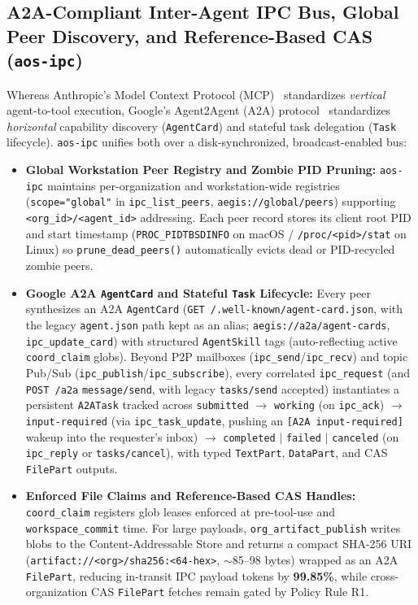 \documentclass[10pt,twocolumn]{article}
\begin{document}
\subsection{A2A-Compliant Inter-Agent IPC Bus, Global Peer Discovery, and Reference-Based CAS (\texttt{aos-ipc})}
\label{sec:ipc}

Whereas Anthropic's Model Context Protocol (MCP)~\cite{anthropic2024mcp} standardizes \emph{vertical} agent-to-tool execution, Google's Agent2Agent (A2A) protocol~\cite{google2025a2a} standardizes \emph{horizontal} capability discovery (\texttt{AgentCard}) and stateful task delegation (\texttt{Task} lifecycle). \texttt{aos-ipc} unifies both over a disk-synchronized, broadcast-enabled bus:
\begin{itemize}
    \item \textbf{Global Workstation Peer Registry and Zombie PID Pruning:} \texttt{aos-ipc} maintains per-organization and workstation-wide registries (\texttt{scope="global"} in \texttt{ipc\_list\_peers}, \texttt{aegis://global/peers}) supporting \texttt{<org\_id>/<agent\_id>} addressing. Each peer record stores its client root PID and start timestamp (\texttt{PROC\_PIDTBSDINFO} on macOS / \texttt{/proc/<pid>/stat} on Linux) so \texttt{prune\_dead\_peers()} automatically evicts dead or PID-recycled zombie peers.
    \item \textbf{Google A2A \texttt{AgentCard} and Stateful \texttt{Task} Lifecycle:} Every peer synthesizes an A2A \texttt{AgentCard} (\texttt{GET /.well-known/agent-card.json}, with the legacy \texttt{agent.json} path kept as an alias; \texttt{aegis://a2a/agent-cards}, \texttt{ipc\_update\_card}) with structured \texttt{AgentSkill} tags (auto-reflecting active \texttt{coord\_claim} globs). Beyond P2P mailboxes (\texttt{ipc\_send}/\texttt{ipc\_recv}) and topic Pub/Sub (\texttt{ipc\_publish}/\texttt{ipc\_subscribe}), every correlated \texttt{ipc\_request} (and \texttt{POST /a2a} \texttt{message/send}, with legacy \texttt{tasks/send} accepted) instantiates a persistent \texttt{A2ATask} tracked across \texttt{submitted} $\to$ \texttt{working} (on \texttt{ipc\_ack}) $\to$ \texttt{input-required} (via \texttt{ipc\_task\_update}, pushing an \texttt{[A2A input-required]} wakeup into the requester's inbox) $\to$ \texttt{completed} $\mid$ \texttt{failed} $\mid$ \texttt{canceled} (on \texttt{ipc\_reply} or \texttt{tasks/cancel}), with typed \texttt{TextPart}, \texttt{DataPart}, and CAS \texttt{FilePart} outputs.
    \item \textbf{Enforced File Claims and Reference-Based CAS Handles:} \texttt{coord\_claim} registers glob leases enforced at pre-tool-use and \texttt{workspace\_commit} time. For large payloads, \texttt{org\_artifact\_publish} writes blobs to the Content-Addressable Store and returns a compact SHA-256 URI (\texttt{artifact://<org>/sha256:<64-hex>}, $\sim$85--98 bytes) wrapped as an A2A \texttt{FilePart}, reducing in-transit IPC payload tokens by \textbf{99.85\%}, while cross-organization CAS \texttt{FilePart} fetches remain gated by Policy Rule R1.
\end{itemize}
\end{document}
